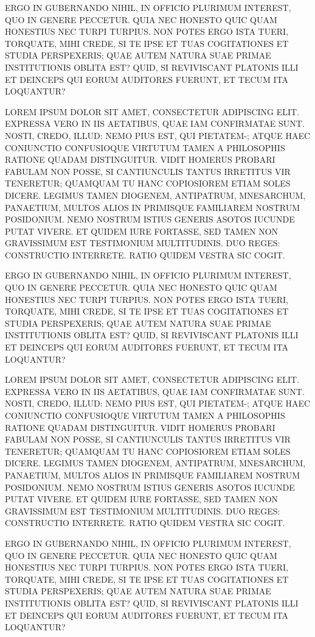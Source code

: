 \documentclass[letterpaper]{article}
\begin{document}
ERGO IN GUBERNANDO NIHIL, IN OFFICIO PLURIMUM INTEREST, QUO IN GENERE PECCETUR. QUIA NEC HONESTO QUIC QUAM HONESTIUS NEC TURPI TURPIUS. NON POTES ERGO ISTA TUERI, TORQUATE, MIHI CREDE, SI TE IPSE ET TUAS COGITATIONES ET STUDIA PERSPEXERIS; QUAE AUTEM NATURA SUAE PRIMAE INSTITUTIONIS OBLITA EST? QUID, SI REVIVISCANT PLATONIS ILLI ET DEINCEPS QUI EORUM AUDITORES FUERUNT, ET TECUM ITA LOQUANTUR?

LOREM IPSUM DOLOR SIT AMET, CONSECTETUR ADIPISCING ELIT. EXPRESSA VERO IN IIS AETATIBUS, QUAE IAM CONFIRMATAE SUNT. NOSTI, CREDO, ILLUD: NEMO PIUS EST, QUI PIETATEM-; ATQUE HAEC CONIUNCTIO CONFUSIOQUE VIRTUTUM TAMEN A PHILOSOPHIS RATIONE QUADAM DISTINGUITUR. VIDIT HOMERUS PROBARI FABULAM NON POSSE, SI CANTIUNCULIS TANTUS IRRETITUS VIR TENERETUR; QUAMQUAM TU HANC COPIOSIOREM ETIAM SOLES DICERE. LEGIMUS TAMEN DIOGENEM, ANTIPATRUM, MNESARCHUM, PANAETIUM, MULTOS ALIOS IN PRIMISQUE FAMILIAREM NOSTRUM POSIDONIUM. NEMO NOSTRUM ISTIUS GENERIS ASOTOS IUCUNDE PUTAT VIVERE. ET QUIDEM IURE FORTASSE, SED TAMEN NON GRAVISSIMUM EST TESTIMONIUM MULTITUDINIS. DUO REGES: CONSTRUCTIO INTERRETE. RATIO QUIDEM VESTRA SIC COGIT.

ERGO IN GUBERNANDO NIHIL, IN OFFICIO PLURIMUM INTEREST, QUO IN GENERE PECCETUR. QUIA NEC HONESTO QUIC QUAM HONESTIUS NEC TURPI TURPIUS. NON POTES ERGO ISTA TUERI, TORQUATE, MIHI CREDE, SI TE IPSE ET TUAS COGITATIONES ET STUDIA PERSPEXERIS; QUAE AUTEM NATURA SUAE PRIMAE INSTITUTIONIS OBLITA EST? QUID, SI REVIVISCANT PLATONIS ILLI ET DEINCEPS QUI EORUM AUDITORES FUERUNT, ET TECUM ITA LOQUANTUR?

LOREM IPSUM DOLOR SIT AMET, CONSECTETUR ADIPISCING ELIT. EXPRESSA VERO IN IIS AETATIBUS, QUAE IAM CONFIRMATAE SUNT. NOSTI, CREDO, ILLUD: NEMO PIUS EST, QUI PIETATEM-; ATQUE HAEC CONIUNCTIO CONFUSIOQUE VIRTUTUM TAMEN A PHILOSOPHIS RATIONE QUADAM DISTINGUITUR. VIDIT HOMERUS PROBARI FABULAM NON POSSE, SI CANTIUNCULIS TANTUS IRRETITUS VIR TENERETUR; QUAMQUAM TU HANC COPIOSIOREM ETIAM SOLES DICERE. LEGIMUS TAMEN DIOGENEM, ANTIPATRUM, MNESARCHUM, PANAETIUM, MULTOS ALIOS IN PRIMISQUE FAMILIAREM NOSTRUM POSIDONIUM. NEMO NOSTRUM ISTIUS GENERIS ASOTOS IUCUNDE PUTAT VIVERE. ET QUIDEM IURE FORTASSE, SED TAMEN NON GRAVISSIMUM EST TESTIMONIUM MULTITUDINIS. DUO REGES: CONSTRUCTIO INTERRETE. RATIO QUIDEM VESTRA SIC COGIT.

ERGO IN GUBERNANDO NIHIL, IN OFFICIO PLURIMUM INTEREST, QUO IN GENERE PECCETUR. QUIA NEC HONESTO QUIC QUAM HONESTIUS NEC TURPI TURPIUS. NON POTES ERGO ISTA TUERI, TORQUATE, MIHI CREDE, SI TE IPSE ET TUAS COGITATIONES ET STUDIA PERSPEXERIS; QUAE AUTEM NATURA SUAE PRIMAE INSTITUTIONIS OBLITA EST? QUID, SI REVIVISCANT PLATONIS ILLI ET DEINCEPS QUI EORUM AUDITORES FUERUNT, ET TECUM ITA LOQUANTUR?
\end{document}
